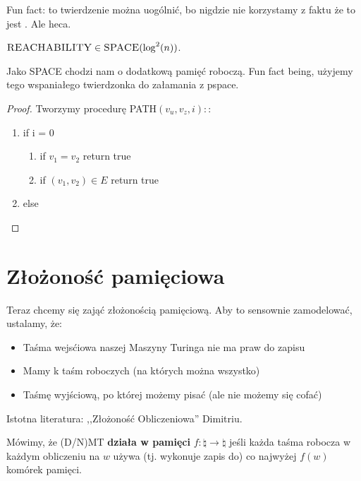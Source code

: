 Fun fact: to twierdzenie można uogólnić, bo nigdzie nie korzystamy z faktu że to jest \conp. Ale heca. 

\begin{theorem} [Savitch]
   \(  \textsc{REACHABILITY} \in \textsc{SPACE}( \log^2(n)) \).  
\end{theorem}

Jako \textsc{SPACE} chodzi nam o dodatkową pamięć roboczą. Fun fact being, użyjemy tego wspaniałego twierdzonka do załamania \pspace z 
pspace.

\begin{proof}
    Tworzymy procedurę \textsc{PATH}\( (v_u, v_z, i): \):
    
    \begin{enumerate}
        \item if i = 0 
        \begin{enumerate}
            \item if \(v_1 = v_2 \) return true
            \item if \( (v_1, v_2) \in E \) return true  
        \end{enumerate}
        \item else 
            
    \end{enumerate}
\end{proof}

\section{Złożoność pamięciowa} 

Teraz chcemy się zająć złożonością pamięciową. Aby to sensownie zamodelować, ustalamy, że:

\begin{itemize}
    \item Taśma wejsćiowa naszej Maszyny Turinga nie ma praw do zapisu 
    \item Mamy k taśm roboczych (na których można wszystko)
    \item Taśmę wyjściową, po której możemy pisać (ale nie możemy się cofać)
\end{itemize}

Istotna literatura: ,,Złożoność Obliczeniowa'' Dimitriu.

\begin{definition}
     Mówimy, że (D/N)MT \textbf{działa w pamięci} \( f : \natural \rightarrow \natural \) jeśli każda taśma robocza  w każdym obliczeniu na \( w \)
      używa (tj. wykonuje zapis do) co najwyżej \( f(w) \) komórek pamięci.
\end{definition}

